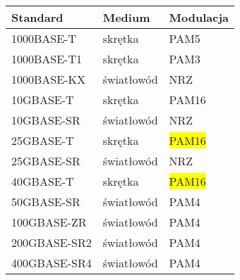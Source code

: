 \begingroup
{}
\begin{table}[h]
\centering
    \begin{tabular}{m{3cm} m{3cm} m{3cm}}
    \toprule
    Standard & Medium & Modulacja \\
    \midrule
    1000BASE-T & skrętka & PAM5 \\
    \midrule
    1000BASE-T1 & skrętka & PAM3 \\
    \midrule
    1000BASE-KX & światłowód & NRZ \\
    \midrule
    10GBASE-T & skrętka & PAM16 \\
    \midrule
    10GBASE-SR & światłowód & NRZ \\
    \midrule
    25GBASE-T & skrętka & \colorbox{yellow}{PAM16} \\
    \midrule
    25GBASE-SR & światłowód & NRZ \\
    \midrule
    40GBASE-T & skrętka & \colorbox{yellow}{PAM16} \\
    \midrule
    50GBASE-SR & światłowód & PAM4 \\
    \midrule
    100GBASE-ZR & światłowód & PAM4 \\
    \midrule
    200GBASE-SR2 & światłowód & PAM4 \\
    \midrule
    400GBASE-SR4 & światłowód & PAM4 \\
    \bottomrule
    \end{tabular}
\end{table}
\endgroup
